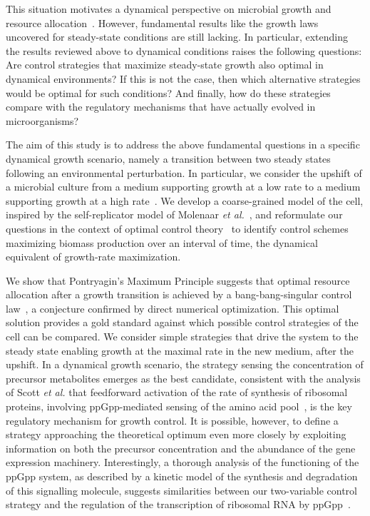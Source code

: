 This situation motivates a dynamical perspective on microbial growth and resource allocation~\cite{pavlov_optimal_2013,vandenberg_optimal_1998,waldherr_dynamic_2015,ehrenberg_mediumdependent_2012}. However, fundamental results like the growth laws uncovered for steady-state conditions are still lacking.
In particular, extending the results reviewed above to dynamical conditions raises the following questions:
Are control strategies that maximize steady-state growth also optimal in dynamical environments?
If this is not the case, then which alternative strategies would be optimal for such conditions?
And finally, how do these strategies compare with the regulatory mechanisms that have actually evolved in microorganisms?

The aim of this study is to address the above fundamental questions in a specific dynamical growth scenario, namely a transition between two steady states following an environmental perturbation.
In particular, we consider the upshift of a microbial culture from a medium supporting growth at a low rate to a medium supporting growth at a high rate~\cite{ehrenberg_mediumdependent_2012}.
We develop a coarse-grained model of the cell, inspired by the self-replicator model of Molenaar \textit{et al.}~\cite{molenaar_shifts_2009}, and reformulate our questions in the context of optimal control theory~\cite{stengel_optimal_1994} to identify control schemes maximizing biomass production over an interval of time, the dynamical equivalent of growth-rate maximization.

We show that Pontryagin's Maximum Principle suggests that optimal resource allocation after a growth transition is achieved by a bang-bang-singular control law~\cite{stengel_optimal_1994}, a conjecture confirmed by direct numerical optimization.
This optimal solution provides a gold standard against which possible control strategies of the cell can be compared.
We consider simple strategies that drive the system to the steady state enabling growth at the maximal rate in the new medium, after the upshift.
In a dynamical growth scenario, the strategy sensing the concentration of precursor metabolites emerges as the best candidate, consistent with the analysis of Scott \textit{et al.} that feedforward activation of the rate of synthesis of ribosomal proteins, involving ppGpp-mediated sensing of the amino acid pool~\cite{dalebroux_ppgpp_2012,potrykus_pppgpp_2008,hauryliuk_recent_2015}, is the key regulatory mechanism for growth control.
It is possible, however, to define a strategy approaching the theoretical optimum even more closely by exploiting information on both the precursor concentration and the abundance of the gene expression machinery.
Interestingly, a thorough analysis of the functioning of the ppGpp system, as described by a kinetic model of the synthesis and degradation of this signalling molecule, suggests similarities between our two-variable control strategy and the regulation of the transcription of ribosomal RNA by ppGpp~\cite{bosdriesz_how_2015}.

